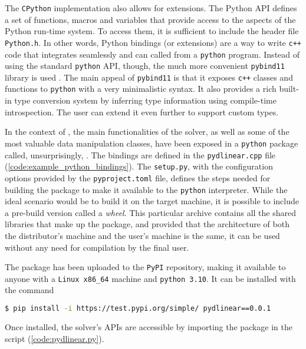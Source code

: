 The \texttt{CPython} implementation also allows for extensions.
The Python API defines a set of functions, macros and variables that provide access to the aspects of the Python run-time system.
To access them, it is sufficient to include the header file \texttt{Python.h}.
In other words, Python bindings (or extensions) are a way to write \texttt{c++} code that integrates seamlessly and can called from a \texttt{python} program.
Instead of using the standard \texttt{python} API, though, the much more convenient \texttt{pybind11} library is used \cite{man:pybind11}.
The main appeal of \texttt{pybind11} is that it exposes \texttt{c++} classes and functions to \texttt{python} with a very minimalistic syntax.
It also provides a rich built-in type conversion system by inferring type information using compile-time introspection.
The user can extend it even further to support custom types.

In the context of \dlinear, the main functionalities of the solver, as well as some of the most valuable data manipulation classes, have been exposed in a \texttt{python} package called, unsurprisingly, \pydlinear.
The bindings are defined in the \texttt{pydlinear.cpp} file (\autoref{code:example_python_bindings}).
The \texttt{setup.py}, with the configuration options provided by the \texttt{pyproject.toml} file, defines the steps needed for building the package to make it available to the \texttt{python} interpreter.
While the ideal scenario would be to build it on the target machine, it is possible to include a pre-build version called a \textit{wheel}.
This particular archive contains all the shared libraries that make up the package, and provided that the architecture of both the distributor's machine and the user's machine is the same, it can be used without any need for compilation by the final user.



The package has been uploaded to the \texttt{PyPI} repository, making it available to anyone with a \texttt{Linux x86\_64} machine and \texttt{python 3.10}.
It can be installed with the command

\begin{lstlisting}[language=bash,frame=single,showstringspaces=false]
$ pip install -i https://test.pypi.org/simple/ pydlinear==0.0.1
\end{lstlisting}
Once installed, the solver's APIs are accessible by importing the \pydlinear package in the script (\autoref{code:pydlinear.py}).

